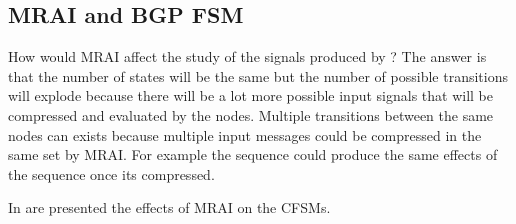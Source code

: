 \subsection{MRAI and BGP FSM}
\label{subsec:mrai_vs_bgpfsm}

How would \ac{MRAI} affect the study of the signals produced by ?
The answer is that the number of states will be the same but the number of possible
transitions will explode because there will be a lot more possible
input signals that will be compressed and evaluated by the nodes.
Multiple transitions between the same nodes can exists because multiple input
messages could be compressed in the same set by \ac{MRAI}.
For example the sequence  could produce the same effects of the sequence
 once its compressed.

In  are presented the effects of \ac{MRAI} on the \ac{CFSM}s.

